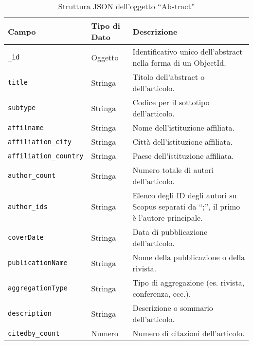 \begin{table}[ht]
    \centering
    \begin{tabularx}{\textwidth}{|l|l|X|}
        \hline
        \textbf{Campo} & \textbf{Tipo di Dato} & \textbf{Descrizione} \\
        \hline
        \texttt{\_id} & Oggetto & Identificativo unico dell'abstract nella forma di un ObjectId. \\
        \hline
        \texttt{title} & Stringa & Titolo dell'abstract o dell'articolo. \\
        \hline
        \texttt{subtype} & Stringa & Codice per il sottotipo dell'articolo. \\
        \hline
        \texttt{affilname} & Stringa & Nome dell'istituzione affiliata. \\
        \hline
        \texttt{affiliation\_city} & Stringa & Città dell'istituzione affiliata. \\
        \hline
        \texttt{affiliation\_country} & Stringa & Paese dell'istituzione affiliata. \\
        \hline
        \texttt{author\_count} & Stringa & Numero totale di autori dell'articolo. \\
        \hline
        \texttt{author\_ids} & Stringa & Elenco degli ID degli autori su Scopus separati da ``;'', il primo è l'autore principale. \\
        \hline
        \texttt{coverDate} & Stringa & Data di pubblicazione dell'articolo. \\
        \hline
        \texttt{publicationName} & Stringa & Nome della pubblicazione o della rivista. \\
        \hline
        \texttt{aggregationType} & Stringa & Tipo di aggregazione (es. rivista, conferenza, ecc.). \\
        \hline
        \texttt{description} & Stringa & Descrizione o sommario dell'articolo. \\
        \hline
        \texttt{citedby\_count} & Numero & Numero di citazioni dell'articolo. \\
        \hline
    \end{tabularx}
    \caption{Struttura JSON dell'oggetto ``Abstract''}
    \label{tab:json_structure_abstract}
\end{table}

